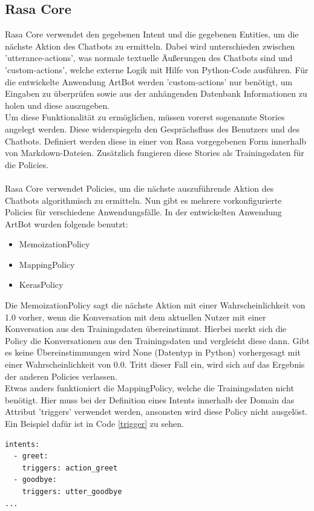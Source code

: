 \subsection{Rasa Core}\label{sec:flowcore}
Rasa Core verwendet den gegebenen Intent und die gegebenen Entities, um die nächste Aktion des Chatbots zu ermitteln. Dabei wird unterschieden zwischen 'utterance-actions', was normale textuelle Äußerungen des Chatbots sind und 'custom-actions', welche externe Logik mit Hilfe von Python-Code ausführen. Für die entwickelte Anwendung ArtBot werden 'custom-actions' nur benötigt, um Eingaben zu überprüfen sowie aus der anhängenden Datenbank Informationen zu holen und diese auszugeben.\\
Um diese Funktionalität zu ermöglichen, müssen vorerst sogenannte Stories angelegt werden. Diese widerspiegeln den Gesprächsfluss des Benutzers und des Chatbots. Definiert werden diese in einer von Rasa vorgegebenen Form innerhalb von Markdown-Dateien. Zusätzlich fungieren diese Stories als Trainingsdaten für die Policies.\\
\\
Rasa Core verwendet Policies, um die nächste auszuführende Aktion des Chatbots algorithmisch zu ermitteln. Nun gibt es mehrere vorkonfigurierte Policies für verschiedene Anwendungsfälle. In der entwickelten Anwendung ArtBot wurden folgende benutzt:
\begin{itemize}
	\setlength\itemsep{-0.6em}
	\item MemoizationPolicy
	\item MappingPolicy
	\item KerasPolicy
\end{itemize}
Die MemoizationPolicy sagt die nächste Aktion mit einer Wahrscheinlichkeit von 1.0 vorher, wenn die Konversation mit dem aktuellen Nutzer mit einer Konversation aus den Trainingsdaten übereinstimmt. Hierbei merkt sich die Policy die Konversationen aus den Trainingsdaten und vergleicht diese dann. Gibt es keine Übereinstimmungen wird None (Datentyp in Python) vorhergesagt mit einer Wahrscheinlichkeit von 0.0. Tritt dieser Fall ein, wird sich auf das Ergebnis der anderen Policies verlassen.\\
Etwas anders funktioniert die MappingPolicy, welche die Trainingsdaten nicht benötigt. Hier muss bei der Definition eines Intents innerhalb der Domain das Attribut 'triggers' verwendet werden, ansonsten wird diese Policy nicht ausgelöst. Ein Beispiel dafür ist in Code \ref{trigger} zu sehen.
\begin{lstlisting}[caption={Verwendung der MappingPolicy innerhalb von ArtBot.}, label=trigger, lineskip=1pt, morekeywords={intents, greet, goodbye}]
intents:
  - greet:
    triggers: action_greet
  - goodbye:
    triggers: utter_goodbye
...
\end{lstlisting}
